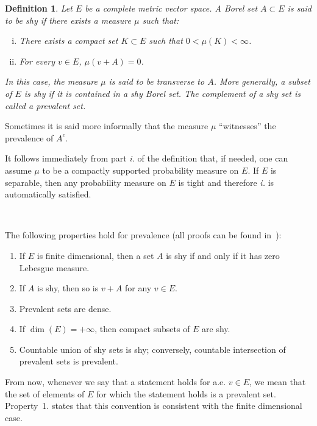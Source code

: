 \documentclass[10pt]{article}
\newcommand{\tmtextit}[1]{{\itshape{#1}}}
\newenvironment{enumeratenumeric}{\begin{enumerate}[1.] }{\end{enumerate}}
\newenvironment{enumerateroman}{\begin{enumerate}[i.] }{\end{enumerate}}
\newtheorem{definition}{Definition}
\begin{document}
\begin{definition}
  \label{definition prevalence}Let $E$ be a complete metric vector space. A
  Borel set $A \subset E$ is said to be \tmtextit{shy} if there exists a
  measure $\mu$ such that:
  \begin{enumerateroman}
    \item There exists a compact set $K \subset E$ such that $0 < \mu (K) <
    \infty$.
    
    \item For every $v \in E$, $\mu (v + A) = 0$.
  \end{enumerateroman}
  In this case, the measure $\mu$ is said to be transverse to $A$. More
  generally, a subset of $E$ is shy if it is contained in a shy Borel set. The
  complement of a shy set is called a prevalent set.
\end{definition}

Sometimes it is said more informally that the measure $\mu$ ``witnesses'' the
prevalence of $A^c$.

It follows immediately from part \tmtextit{i.} of the definition that, if
needed, one can assume $\mu$ to be a compactly supported probability measure
on $E$. If $E$ is separable, then any probability measure on $E$ is tight and
therefore \tmtextit{i.} is automatically satisfied.

\

The following properties hold for prevalence (all proofs can be found
in~{\cite{huntsauer}}):
\begin{enumeratenumeric}
  \item If $E$ is finite dimensional, then a set $A$ is shy if and only if it
  has zero Lebesgue measure.
  
  \item If $A$ is shy, then so is $v + A$ for any $v \in E$.
  
  \item Prevalent sets are dense.
  
  \item If $\dim (E) = + \infty$, then compact subsets of $E$ are shy.
  
  \item Countable union of shy sets is shy; conversely, countable intersection
  of prevalent sets is prevalent. 
\end{enumeratenumeric}
From now, whenever we say that a statement holds for a.e. $v \in E$, we mean
that the set of elements of $E$ for which the statement holds is a prevalent
set. Property~1. states that this convention is consistent with the finite
dimensional case.
\end{document}
